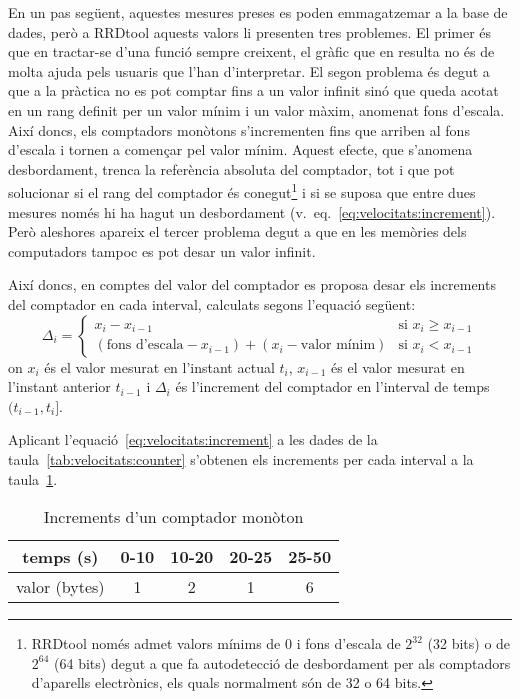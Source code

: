 En un pas següent, aquestes mesures preses es poden emmagatzemar a la base de dades, però a RRDtool aquests valors li presenten tres problemes. El primer és que en tractar-se d'una funció sempre creixent, el gràfic que en resulta no és de molta ajuda pels usuaris que l'han d'interpretar. El segon problema és degut a que a la pràctica no es pot comptar fins a un valor infinit sinó que queda acotat en un rang definit per un valor mínim i un valor màxim, anomenat fons d'escala. Així doncs, els comptadors monòtons s'incrementen fins que arriben al fons d'escala i tornen a començar pel valor mínim. Aquest efecte, que s'anomena desbordament, trenca la referència absoluta del comptador, tot i que pot solucionar si el rang del comptador és conegut\footnote{RRDtool només admet valors mínims de 0 i fons d'escala de $2^{32}$ (32 bits) o de $2^{64}$ (64 bits) degut a que fa autodetecció de desbordament per als comptadors d'aparells electrònics, els quals normalment són de 32 o 64 bits.}
i si se suposa que entre dues mesures només hi ha hagut un desbordament (v.\ eq.~\ref{eq:velocitats:increment}). Però aleshores apareix el tercer problema degut a que en les memòries dels computadors tampoc es pot desar un valor infinit.
 
Així doncs, en comptes del valor del comptador es proposa desar els increments del comptador en cada interval, calculats segons l'equació següent:
\begin{equation}\label{eq:velocitats:increment}
\Delta_i = \left\{\begin{array}{ll}
x_i-x_{i-1} & \text{si }  x_{i} \geq x_{i-1} \\
(\text{fons d'escala} -x_{i-1})+ (x_i - \text{valor mínim}) & \text{si }  x_{i} < x_{i-1} 
\end{array}\right.
\end{equation}
on $x_i$ és el valor mesurat en l'instant actual $t_i$, $x_{i-1}$ és el valor mesurat en l'instant anterior $t_{i-1}$ i $\Delta_i$ és l'increment del comptador en l'interval de temps $(t_{i-1},t_i]$.

Aplicant l'equació~\ref{eq:velocitats:increment} a les dades de la taula~\ref{tab:velocitats:counter} s'obtenen els increments per cada interval a la taula~\ref{tab:velocitats:absolute}.

\begin{table}[tbp]
\centering
\begin{tabular}{c|cccc}
  temps (s) & 0-10 & 10-20 & 20-25 & 25-50 \\ \hline
valor (bytes)& 1 & 2 & 1 & 6
\end{tabular}
\caption{Increments d'un comptador monòton}
\label{tab:velocitats:absolute}
\end{table}


